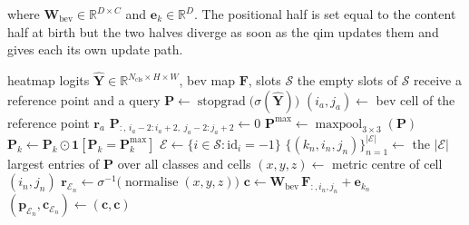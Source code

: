where $\mathbf{W}_{\mathrm{bev}} \in \mathbb{R}^{D \times C}$ and $\mathbf{e}_k \in \mathbb{R}^{D}$. The
positional half is set equal to the content half at birth but the two halves diverge as soon as the \ac{qim} updates them and gives each
its own update path.

\begin{algorithm}[H]
    \caption{Initialisation of the empty slots from the \ac{lidar} heatmap}
    \label{alg:design-init}
    \begin{algorithmic}[1]
        \Require heatmap logits $\hat{\mathbf{Y}} \in \mathbb{R}^{N_{\mathrm{cls}} \times H \times W}$,
        \ac{bev} map $\mathbf{F}$, slots $\mathcal{S}$
        \Ensure the empty slots of $\mathcal{S}$ receive a reference point and a query
            \State $\mathbf{P} \gets \operatorname{stopgrad}\big( \sigma(\hat{\mathbf{Y}}) \big)$
                \State $(i_a, j_a) \gets$ \ac{bev} cell of the reference point $\mathbf{r}_a$
                \State $\mathbf{P}_{:,\, i_a-2 : i_a+2,\; j_a-2 : j_a+2} \gets 0$ 
            \EndFor
            \State $\mathbf{P}^{\max} \gets \operatorname{maxpool}_{3 \times 3}(\mathbf{P})$
                \State $\mathbf{P}_k \gets \mathbf{P}_k \odot \mathbf{1}\!\left[ \mathbf{P}_k = \mathbf{P}^{\max}_k \right]$
            \EndFor
            \State $\mathcal{E} \gets \{ i \in \mathcal{S} : \mathrm{id}_i = -1 \}$ 
            \State $\{(k_n, i_n, j_n)\}_{n=1}^{\lvert \mathcal{E} \rvert} \gets$ the $\lvert \mathcal{E} \rvert$
            largest entries of $\mathbf{P}$ over all classes and cells
                \State $(x, y, z) \gets$ metric centre of cell $(i_n, j_n)$ 
                \State $\mathbf{r}_{\mathcal{E}_n} \gets \sigma^{-1}\big( \operatorname{normalise}(x, y, z) \big)$
                \State $\mathbf{c} \gets \mathbf{W}_{\mathrm{bev}}\, \mathbf{F}_{:,i_n,j_n} + \mathbf{e}_{k_n}$  
                \State $(\mathbf{p}_{\mathcal{E}_n}, \mathbf{c}_{\mathcal{E}_n}) \gets (\mathbf{c}, \mathbf{c})$  
            \EndFor
        \EndFunction
    \end{algorithmic}
\end{algorithm}

